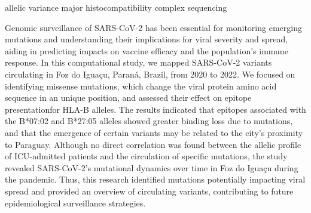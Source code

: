 {allelic variance}
{major histocompatibility complex}
{sequencing}




\begin{justifying}

Genomic surveillance of SARS-CoV-2 has been essential for monitoring emerging mutations and understanding their implications for viral severity and spread, aiding in predicting impacts on vaccine efficacy and the population's immune response. In this computational study, we mapped SARS-CoV-2 variants circulating in Foz do Iguaçu, Paraná, Brazil, from 2020 to 2022. We focused on identifying missense mutations, which change the viral protein amino acid sequence in an unique position, and assessed their effect on epitope presentationfor HLA-B alleles. The results indicated that epitopes associated with the B*07:02 and B*27:05 alleles showed greater binding loss due to mutations, and that the emergence of certain variants may be related to the city’s proximity to Paraguay. Although no direct correlation was found between the allelic profile of ICU-admitted patients and the circulation of specific mutations, the study revealed SARS-CoV-2's mutational dynamics over time in Foz do Iguaçu during the pandemic. Thus, this research identified mutations potentially impacting viral spread and provided an overview of circulating variants, contributing to future epidemiological surveillance strategies.

\end{justifying}

\printkeys %

